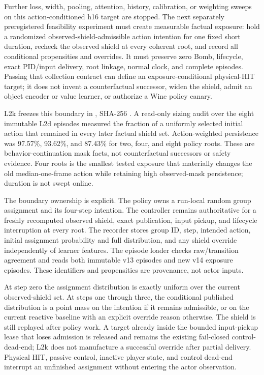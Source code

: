 \documentclass[11pt]{article}
\begin{document}
Further loss, width, pooling, attention, history, calibration, or weighting
sweeps on this action-conditioned h16 target are stopped.  The next separately
preregistered feasibility experiment must create measurable factual exposure:
hold a randomized observed-shield-admissible action intention for one fixed
short duration, recheck the observed shield at every coherent root, and record
all conditional propensities and overrides.  It must preserve zero Bomb,
lifecycle, exact PID/input delivery, root linkage, normal clock, and complete
episodes.  Passing that collection contract can define an exposure-conditional
physical-HIT target; it does not invent a counterfactual successor, widen the
shield, admit an object encoder or value learner, or authorize a Wine policy
canary.

L2k freezes this boundary in
, SHA-256
.
A read-only sizing
audit over the eight immutable L2d episodes measured the fraction of a
uniformly selected initial action that remained in every later factual shield
set.  Action-weighted persistence was 97.57\%, 93.62\%, and 87.43\% for two,
four, and eight policy roots.  These are behavior-continuation mask facts, not
counterfactual successors or safety evidence.  Four roots is the smallest
tested exposure that materially changes the old median-one-frame action while
retaining high observed-mask persistence; duration is not swept online.

The boundary ownership is explicit.  The policy owns a run-local random group
assignment and its four-step intention.  The controller remains authoritative
for a freshly recomputed observed shield, exact publication, input pickup, and
lifecycle interruption at every root.  The recorder stores group ID, step,
intended action, initial assignment probability and full distribution, and any
shield override independently of learner features.  The episode loader checks
raw/transition agreement and reads both immutable v13 episodes and new v14
exposure episodes.  These identifiers and propensities are provenance, not
actor inputs.

At step zero the assignment distribution is exactly uniform over the current
observed-shield set.  At steps one through three, the conditional published
distribution is a point mass on the intention if it remains admissible, or on
the current reactive baseline with an explicit override reason otherwise.
The shield is still replayed after policy work.  A target already inside the
bounded input-pickup lease that loses admission is released and remains the
existing fail-closed control-dead-end; L2k does not manufacture a successful
override after partial delivery.  Physical HIT, passive control, inactive
player state, and control dead-end interrupt an unfinished assignment without
entering the actor observation.
\end{document}
